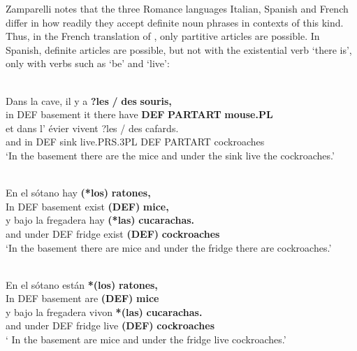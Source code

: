 Zamparelli notes that the three Romance languages Italian, Spanish and French differ in how readily they accept definite noun phrases in contexts of this kind. Thus, in the French translation of , only partitive articles are possible. In Spanish, definite articles are possible, but not with the existential verb  ‘there is’, only with verbs such as  ‘be’ and  ‘live’:

\ea \label{} 
\\
\gll Dans  la  cave,  il  y  a  \textbf{?les} \textbf{/} \textbf{des} \textbf{souris,}\\
in  DEF  basement  it  there  have  \textbf{DEF}  \textbf{PARTART} \textbf{mouse.PL}\\
\gll et  dans  l’  évier  vivent  ?les  /  des  cafards.\\
and  in  DEF  sink  live.PRS.3PL  DEF    PARTART  cockroaches\\
\glt ‘In the basement there are the mice and under the sink live the cockroaches.’ 

\z

\ea \label{} 
\\
\gll En  el  sótano  hay  \textbf{(*los)} \textbf{  ratones,}\\
In  DEF  basement  exist  \textbf{(DEF)} \textbf{mice,}\\
\gll y  bajo  la  fregadera  hay  \textbf{(*las)} \textbf{cucarachas.}\\
and  under  DEF  fridge  exist  \textbf{(DEF)} \textbf{cockroaches}\\
\glt ‘In the basement there are mice and under the fridge there are cockroaches.’  

\z

\ea \label{} 
\\
\gll En  el  sótano  están  \textbf{*(los)} \textbf{  ratones,}\\
In  DEF  basement  are  \textbf{(DEF)} \textbf{mice}\\
\gll y  bajo  la  fregadera  vivon  \textbf{*(las)} \textbf{cucarachas.}\\
and  under  DEF  fridge  live  \textbf{(DEF)} \textbf{cockroaches}\\
\glt ‘ In the basement are mice and under the fridge live cockroaches.’  

\z

